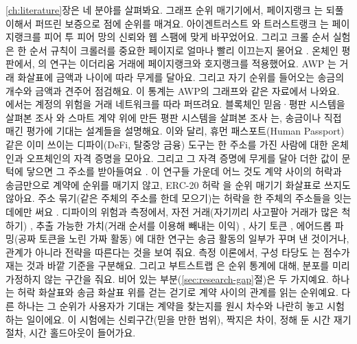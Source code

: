 \ref{ch:literature}장은 네 분야를 살펴봐요. 그래프 순위 매기기에서, 페이지랭크 \parencite{page1999pagerank}는 되풀이해서 퍼뜨린 보증으로 점에 순위를 매겨요. 아이겐트러스트 \parencite{kamvar2003eigentrust}와 트러스트랭크 \parencite{gyongyi2004trustrank}는 페이지랭크를 피어 투 피어 망의 신뢰와 웹 스팸에 맞게 바꾸었어요. 그리고 크롤 순서 실험은 한 순서 규칙이 크롤러를 중요한 페이지로 얼마나 빨리 이끄는지 물어요 \parencite{cho1998crawling}. 온체인 평판에서, \textcite{do2023hodgerank}의 연구는 이더리움 거래에 페이지랭크와 호지랭크를 적용했어요. AWP \parencite{do2023awp}는 거래 화살표에 금액과 나이에 따라 무게를 달아요. 그리고 자기 순위를 들어오는 송금의 개수와 금액과 견주어 점검해요. 이 통계는 AWP의 그래프와 같은 자료에서 나와요. \textcite{lin2025riskprop}에서는 계정의 위험을 거래 네트워크를 따라 퍼뜨려요. 블록체인 믿음·평판 시스템을 살펴본 조사 \parencite{bellini2020trust}와 스마트 계약 위에 만든 평판 시스템을 살펴본 조사 \parencite{almasoud2020reputation}는, 송금이나 직접 매긴 평가에 기대는 설계들을 설명해요. 이와 달리, 휴먼 패스포트(Human Passport) 같은 이미 쓰이는 디파이(DeFi, 탈중앙 금융) 도구는 한 주소를 가진 사람에 대한 온체인과 오프체인의 자격 증명을 모아요. 그리고 그 자격 증명에 무게를 달아 더한 값이 문턱에 닿으면 그 주소를 받아들여요 \parencite{humanpassportnddocs}. 이 연구들 가운데 어느 것도 계약 사이의 허락과 송금만으로 계약에 순위를 매기지 않고, ERC-20 허락 \parencite{vogelsteller2015erc20}을 순위 매기기 화살표로 쓰지도 않아요. 주소 묶기(같은 주체의 주소를 한데 모으기)는 허락을 한 주체의 주소들을 잇는 데에만 써요 \parencite{victor2020clustering}. 디파이의 위험과 측정에서, 자전 거래(자기끼리 사고팔아 거래가 많은 척하기) \parencite{victor2021washtrading}, 추출 가능한 가치(거래 순서를 이용해 빼내는 이익) \parencite{daian2020flashboys}, 사기 토큰 \parencite{xia2021scamtokens}, 에어드롭 파밍(공짜 토큰을 노린 가짜 활동) \parencite{luo2025airdrop}에 대한 연구는 송금 활동의 일부가 꾸며 낸 것이거나, 관계가 아니라 전략을 따른다는 것을 보여 줘요. 측정 이론에서, 구성 타당도 \parencite{cronbach1955construct}는 점수가 재는 것과 바깥 기준을 구분해요. 그리고 부트스트랩 \parencite{efron1979bootstrap}은 순위 통계에 대해, 분포를 미리 가정하지 않는 구간을 줘요. 비어 있는 부분(\ref{sec:research-gap}절)은 두 가지예요. 하나는 허락 화살표와 송금 화살표 위를 걷는 걷기로 계약 사이의 관계를 읽는 순위예요. 다른 하나는 그 순위가 사용자가 기대는 계약을 찾는지를 원시 차수와 나란히 놓고 시험하는 일이에요. 이 시험에는 신뢰구간(믿을 만한 범위), 짝지은 차이, 정해 둔 시간 재기 절차, 시간 홀드아웃이 들어가요.


